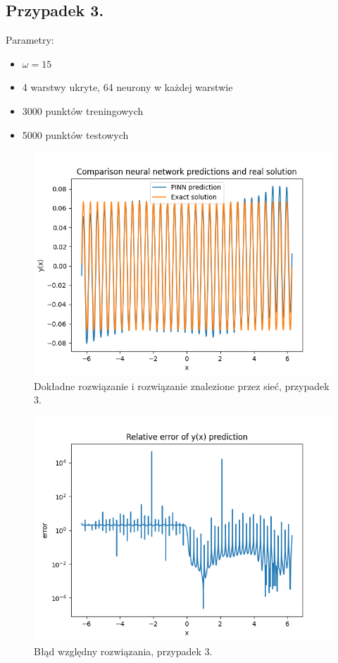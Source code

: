 \documentclass[11pt, leqno]{scrartcl}
\begin{document}
    \subsection{Przypadek 3.}
    Parametry:
    \begin{itemize}
        \item $\omega =15$
        \item 4 warstwy ukryte, 64 neurony w każdej warstwie
        \item 3000 punktów treningowych
        \item 5000 punktów testowych
    \end{itemize}
    \begin{figure}[H]
        \centering
        \includegraphics[width=0.7\linewidth]{nn_b2_f.png}
        \caption{Dokładne rozwiązanie i rozwiązanie znalezione
            przez sieć, przypadek 3.}
    \end{figure}
    \begin{figure}[H]
        \centering
        \includegraphics[width=0.7\linewidth]{nn_b2_err.png}
        \caption{Błąd względny rozwiązania, przypadek 3.}
    \end{figure}
\end{document}
